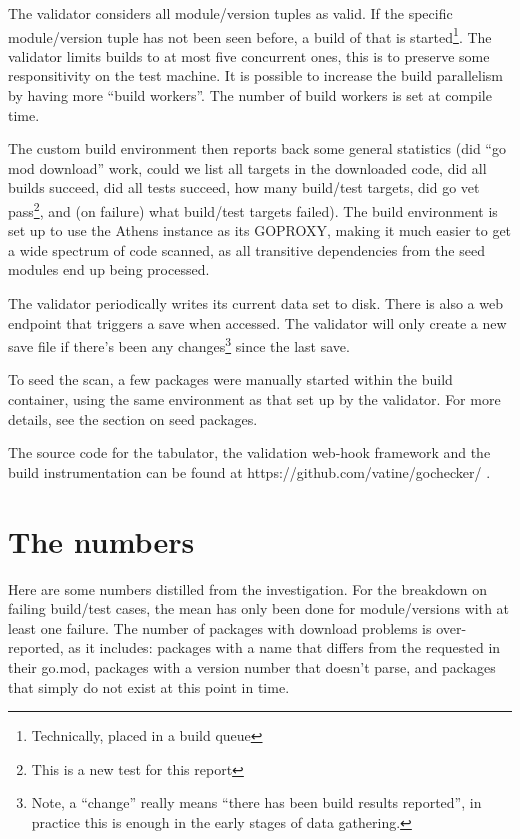 \documentclass[a4paper]{paper}
\begin{document}


The validator considers all module/version tuples as valid. If the
specific module/version tuple has not been seen before, a build of
that is started\footnote{Technically, placed in a build queue}. The
validator limits builds to at most five concurrent ones, this is to
preserve some responsitivity on the test machine. It is possible to
increase the build parallelism by having more ``build workers''. The
number of build workers is set at compile time.

The custom build environment then reports back some general statistics
(did ``go mod download'' work, could we list all targets in the
downloaded code, did all builds succeed, did all tests succeed, how
many build/test targets, did go vet pass\footnote{This is a new test
  for this report}, and (on failure) what build/test targets
failed). The build environment is set up to use the Athens instance as
its GOPROXY, making it much easier to get a wide spectrum of code
scanned, as all transitive dependencies from the seed modules end up
being processed.

The validator periodically writes its current data set to disk. There
is also a web endpoint that triggers a save when accessed. The
validator will only create a new save file if there's been any
changes\footnote{Note, a ``change'' really means ``there has been
  build results reported'', in practice this is enough in the early
  stages of data gathering.}  since the last save.

To seed the scan, a few packages were manually started within the
build container, using the same environment as that set up by the
validator. For more details, see the section on seed packages.

The source code for the tabulator, the validation web-hook framework
and the build instrumentation can be found at
https://github.com/vatine/gochecker/ .

\section{The numbers}

Here are some numbers distilled from the investigation. For the
breakdown on failing build/test cases, the mean has only been done for
module/versions with at least one failure. The number of packages with
download problems is over-reported, as it includes: packages with a
name that differs from the requested in their go.mod, packages with a
version number that doesn't parse, and packages that simply do not
exist at this point in time.
\end{document}
